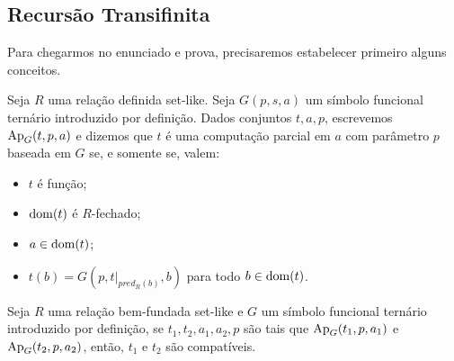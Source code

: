 \subsection{Recursão Transifinita}

Para chegarmos no enunciado e prova, precisaremos estabelecer primeiro alguns conceitos. 

\begin{definition}
    Seja $R$ uma relação definida set-like. Seja $G(p,s,a)$ um símbolo funcional ternário introduzido por definição. 
    Dados conjuntos $t,a,p$, escrevemos $\operatorname{Ap}_G(t,p,a)$ e dizemos que $t$ é uma computação parcial em $a$ com parâmetro $p$ baseada em $G$ se, e somente se, valem:
    \begin{itemize}
        \item $t$ é função;
        \item $\operatorname{dom} (t)$ é $R$-fechado;
        \item $a\in \operatorname{dom}(t)$;
        \item $t(b) = G(p,t|_{pred_R(b)},b)$ para todo $b \in \operatorname{dom}(t)$.
    \end{itemize}
\end{definition}

\begin{lemma}
    Seja $R$ uma relação bem-fundada set-like e $G$ um símbolo funcional ternário introduzido por definição, se $t_1,t_2,a_1,a_2,p$ são tais que $\operatorname{Ap}_G(t_1,p,a_1)$ e $\operatorname{Ap}_G(t_2,p,a_2)$, então, $t_1$ e $t_2$ são compatíveis.

\end{lemma}
